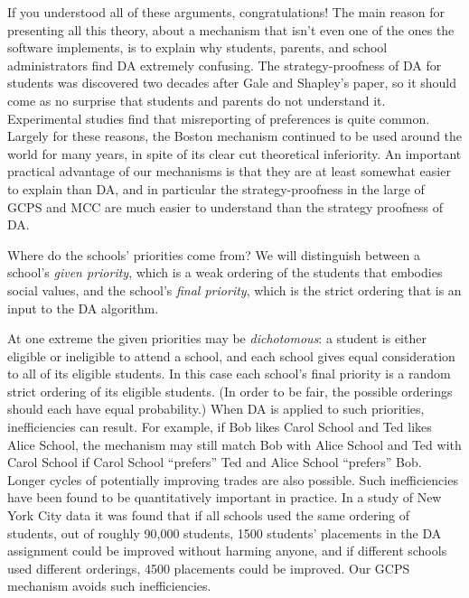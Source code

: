 \documentclass[12pt]{article}
\theoremstyle{definition}
\begin{document}
If you understood all of these arguments, congratulations!  The main
reason for presenting all this theory, about a mechanism that isn't
even one of the ones the software implements, is to explain why
students, parents, and school administrators find DA extremely
confusing.  The strategy-proofness of DA for students was discovered
two decades after Gale and Shapley's paper, so it should come as no
surprise that students and parents do not understand it.  Experimental
studies find that misreporting of preferences is quite common.
Largely for these reasons, the Boston mechanism continued to be used
around the world for many years, in spite of its clear cut theoretical
inferiority.  An important practical advantage of our mechanisms is
that they are at least somewhat easier to explain than DA, and in
particular the strategy-proofness in the large of GCPS and MCC are
much easier to understand than the strategy proofness of DA.

Where do the schools' priorities come from?  We will distinguish
between a school's \emph{given priority}, which is a weak ordering of
the students that embodies social values, and the school's \emph{final
priority}, which is the strict ordering that is an input to the DA
algorithm.

At one extreme the given priorities may be \emph{dichotomous}: a
student is either eligible or ineligible to attend a school, and each
school gives equal consideration to all of its eligible students.  In
this case each school's final priority is a random strict ordering of
its eligible students.  (In order to be fair, the possible orderings
should each have equal probability.)  When DA is applied to such
priorities, inefficiencies can result.  For example, if Bob likes
Carol School and Ted likes Alice School, the mechanism may still match
Bob with Alice School and Ted with Carol School if Carol School
``prefers'' Ted and Alice School ``prefers'' Bob.  Longer cycles of
potentially improving trades are also possible.  Such inefficiencies
have been found to be quantitatively important in practice.  In a
study of New York City data \citep{apr09aer} it was found that if all
schools used the same ordering of students, out of roughly 90,000
students, 1500 students' placements in the DA assignment could be
improved without harming anyone, and if different schools used
different orderings, 4500 placements could be improved.  Our GCPS
mechanism avoids such inefficiencies.
\end{document}
